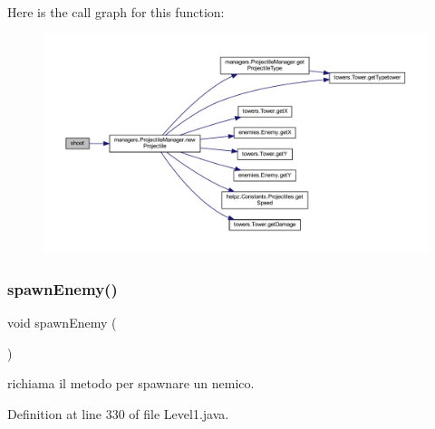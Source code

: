 Here is the call graph for this function\+:\nopagebreak
\begin{figure}[H]
\begin{center}
\leavevmode
\includegraphics[width=350pt]{classscenes_1_1_level1_a200b073564fc341f34b6112718742bae_cgraph}
\end{center}
\end{figure}
\mbox{\label{classscenes_1_1_level1_addfc0c3129b6ff606f7276e175f31a15}} 
\subsubsection{\texorpdfstring{spawn\+Enemy()}{spawnEnemy()}}
{\footnotesize\ttfamily void spawn\+Enemy (\begin{DoxyParamCaption}{ }\end{DoxyParamCaption})\hspace{0.3cm}{\ttfamily [private]}}



richiama il metodo per spawnare un nemico. 



Definition at line 330 of file Level1.\+java.


